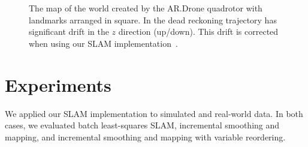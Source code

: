 \documentclass[conference]{IEEEtran}
\begin{document}
\begin{figure}[t]
  \begin{center}
    \caption{The map of the world created by the AR.Drone quadrotor with landmarks
      arranged in square.  In  the dead reckoning trajectory has
      significant drift in the $z$ direction (up/down).  This drift is corrected when
      using our \ac{SLAM} implementation~.}
    \label{fig:mapadjustment}
  \end{center}
\end{figure}



\section{Experiments}
\label{sec:experiments}

We applied our \ac{SLAM} implementation to simulated and real-world data. In both cases, we
evaluated batch least-squares \ac{SLAM}, incremental smoothing and mapping, and incremental
smoothing and mapping with variable reordering. 
\end{document}
